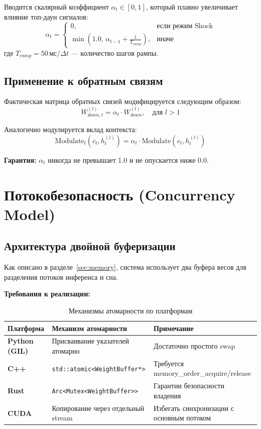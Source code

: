 Вводится скалярный коэффициент $\alpha_t \in [0, 1]$, который плавно увеличивает влияние топ-даун сигналов:
\begin{equation}
\alpha_t = \begin{cases}
0, & \text{если режим Shock} \\
\min\left(1.0, \, \alpha_{t-1} + \frac{1}{T_{ramp}}\right), & \text{иначе}
\end{cases}
\label{eq:alpha_update}
\end{equation}
где $T_{ramp} = 50 \, \text{мс} / \Delta t$ — количество шагов рампы.

\subsection{Применение к обратным связям}

Фактическая матрица обратных связей модифицируется следующим образом:
\begin{equation}
W_{down, t}^{(l)} = \alpha_t \cdot W_{down}^{(l)}, \quad \text{для } l > 1
\label{eq:down_alpha}
\end{equation}

Аналогично модулируется вклад контекста:
\begin{equation}
\text{Modulate}_t(c_t, h_t^{(l)}) = \alpha_t \cdot \text{Modulate}(c_t, h_t^{(l)})
\label{eq:modulate_alpha}
\end{equation}

\textbf{Гарантия:} $\alpha_t$ никогда не превышает 1.0 и не опускается ниже 0.0.

\section{Потокобезопасность (Concurrency Model)}

\subsection{Архитектура двойной буферизации}

Как описано в разделе~\ref{sec:memory}, система использует два буфера весов для разделения потоков инференса и сна.

\textbf{Требования к реализации:}

\begin{table}[h]
\centering
\caption{Механизмы атомарности по платформам}
\label{tab:concurrency}
\begin{tabular}{lp{5cm}p{4cm}}
\toprule
\textbf{Платформа} & \textbf{Механизм атомарности} & \textbf{Примечание} \\
\midrule
\textbf{Python (GIL)} & Присваивание указателей атомарно & Достаточно простого swap \\
\textbf{C++} & \texttt{std::atomic<WeightBuffer*>} & Требуется memory\_order\_acquire/release \\
\textbf{Rust} & \texttt{Arc<Mutex<WeightBuffer>>} & Гарантии безопасности владения \\
\textbf{CUDA} & Копирование через отдельный stream & Избегать синхронизации с основным потоком \\
\bottomrule
\end{tabular}
\end{table}

